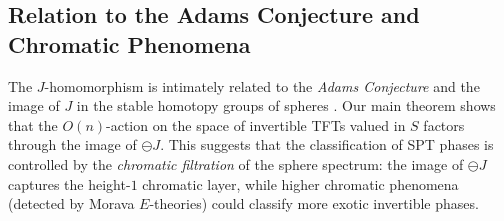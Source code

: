 \documentclass{amsart}
\begin{document}
\subsection{Relation to the Adams Conjecture and Chromatic Phenomena}

The $J$-homomorphism is intimately related to the \emph{Adams Conjecture} and the image of $J$ in the stable homotopy groups of spheres \cite{adams1963groups}. Our main theorem shows that the $O(n)$-action on the space of invertible TFTs valued in $S$ factors through the image of $\ominus J$. This suggests that the classification of SPT phases is controlled by the \emph{chromatic filtration} of the sphere spectrum: the image of $\ominus J$ captures the height-$1$ chromatic layer, while higher chromatic phenomena (detected by Morava $E$-theories) could classify more exotic invertible phases.





{}
\end{document}
